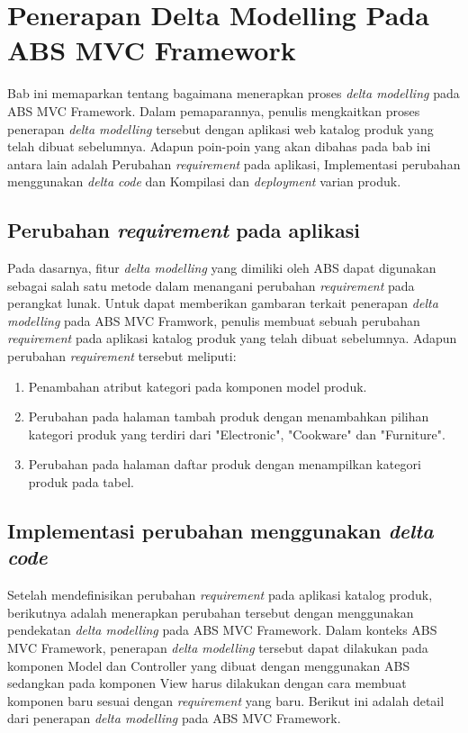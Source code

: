 \chapter{Penerapan Delta Modelling Pada ABS MVC Framework}

Bab ini memaparkan tentang bagaimana menerapkan proses \textit{delta modelling} pada ABS MVC Framework. Dalam pemaparannya, penulis mengkaitkan proses penerapan \textit{delta modelling} tersebut dengan aplikasi web katalog produk yang telah dibuat sebelumnya. Adapun poin-poin yang akan dibahas pada bab ini antara lain adalah Perubahan \textit{requirement} pada aplikasi, Implementasi perubahan menggunakan \textit{delta code} dan Kompilasi dan \textit{deployment} varian produk.

\section{Perubahan \textit{requirement} pada aplikasi}
Pada dasarnya, fitur \textit{delta modelling} yang dimiliki oleh ABS dapat digunakan sebagai salah satu metode dalam menangani perubahan \textit{requirement} pada perangkat lunak. Untuk dapat memberikan gambaran terkait penerapan \textit{delta modelling} pada ABS MVC Framwork, penulis membuat sebuah perubahan \textit{requirement} pada aplikasi katalog produk yang telah dibuat sebelumnya. Adapun perubahan \textit{requirement} tersebut meliputi:

\begin{enumerate}
    \item Penambahan atribut kategori pada komponen model produk.
    \item Perubahan pada halaman tambah produk dengan menambahkan pilihan kategori produk yang terdiri dari "Electronic", "Cookware" dan "Furniture".
    \item Perubahan pada halaman daftar produk dengan menampilkan kategori produk pada tabel.
\end{enumerate}

\section{Implementasi perubahan menggunakan \textit{delta code}}
Setelah mendefinisikan perubahan \textit{requirement} pada aplikasi katalog produk, berikutnya adalah menerapkan perubahan tersebut dengan menggunakan pendekatan \textit{delta modelling} pada ABS MVC Framework. Dalam konteks ABS MVC Framework, penerapan \textit{delta modelling} tersebut dapat dilakukan pada komponen Model dan Controller yang dibuat dengan menggunakan ABS sedangkan pada komponen View harus dilakukan dengan cara membuat komponen baru sesuai dengan \textit{requirement} yang baru. Berikut ini adalah detail dari penerapan \textit{delta modelling} pada ABS MVC Framework.

